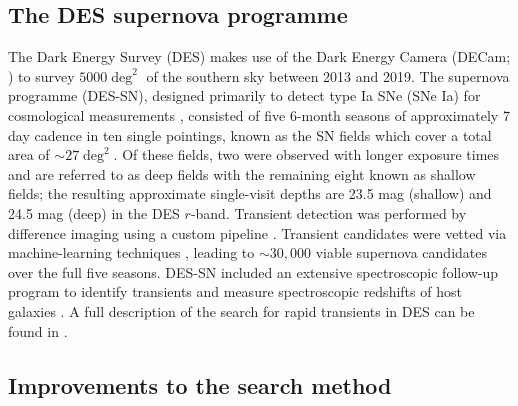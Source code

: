 \documentclass[fleqn,usenatbib,]{mnras}
\newcommand{\replyref}[1]{\color{magenta}#1 \color{black}}
\begin{document}
\subsection{The DES supernova programme \label{subsec:desdata}}

The Dark Energy Survey (DES) makes use of the Dark Energy Camera (DECam; \citealt{Flaugher2015}) to survey $5000\deg^2$ of the southern sky between 2013 and 2019. The supernova programme (DES-SN), designed primarily to detect type Ia SNe (SNe Ia) for cosmological measurements \citep{Bernstein2012}, consisted of five 6-month seasons of approximately 7 day cadence in ten single pointings, known as the SN fields which cover a total area of $\sim27 \deg^2$. Of these fields, two were observed with longer exposure times and are referred to as deep fields with \replyref{the} remaining eight known as shallow fields; the resulting approximate single-visit depths are 23.5 mag (shallow) and 24.5 mag (deep) in the DES $r$-band. Transient detection was performed by difference imaging using a custom pipeline \citep{Kessler2015}. Transient candidates were vetted via machine-learning techniques \citep{Goldstein2015}, leading to $\sim 30,000$ viable supernova candidates over the full five seasons. DES-SN included an extensive spectroscopic follow-up program to identify transients and measure spectroscopic redshifts of host galaxies \citep{DAndrea2018}. A full description of the search for rapid transients in DES can be found in .

\subsection{Improvements to the search method \label{subsec:new_method}}
\end{document}
